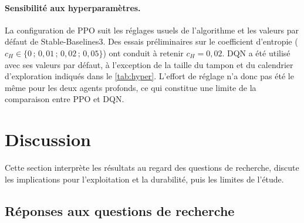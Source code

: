 \documentclass[11pt,a4paper]{article}
\newif\ifrevmarks
\newcommand{\revtag}[1]{\ifrevmarks\textsuperscript{\textcolor{red!70!black}{\scriptsize[#1]}}\fi}
\newenvironment{revbloc}[1]{\par\ifrevmarks\color{revcolor}\noindent\revtag{#1}\ \fi}{\par}
\newcommand{\aexp}[1]{\ifrevmarks\textcolor{orange!85!black}{\textbf{[EXPÉRIENCE À FAIRE : #1]}}\fi}
\newcommand{\adir}[1]{\ifrevmarks\textcolor{violet}{\textbf{[À VALIDER AVEC LA DIRECTRICE : #1]}}\fi}
\begin{document}
\aexp{entraîner 3 à 5 graines par valeur de $w_4$ pour distinguer l'effet de la récompense de la variabilité de l'entraînement (M13).}

\paragraph{Sensibilité aux hyperparamètres.}
\begin{revbloc}{M12}
La configuration de PPO suit les réglages usuels de l'algorithme \cite{JohnSchulman2017} et les valeurs par défaut de Stable-Baselines3. Des essais préliminaires sur le coefficient d'entropie ($c_H \in \{0\,;\,0{,}01\,;\,0{,}02\,;\,0{,}05\}$) ont conduit à retenir $c_H = 0{,}02$. DQN a été utilisé avec ses valeurs par défaut, à l'exception de la taille du tampon et du calendrier d'exploration indiqués dans le \cref{tab:hyper}. L'effort de réglage n'a donc pas été le même pour les deux agents profonds, ce qui constitue une limite de la comparaison entre PPO et DQN.
\end{revbloc}

\adir{les essais préliminaires sur $c_H$ ne figurent dans aucun script du projet : fournir un tableau chiffré (valeurs testées, régime, critère, graines distinctes de l'évaluation) ou supprimer cette mention (M12).}


\section{Discussion}
\label{sec:discussion}

Cette section interprète les résultats au regard des questions de recherche, discute les implications pour l'exploitation et la durabilité, puis les limites de l'étude.

\subsection{Réponses aux questions de recherche}
\end{document}

